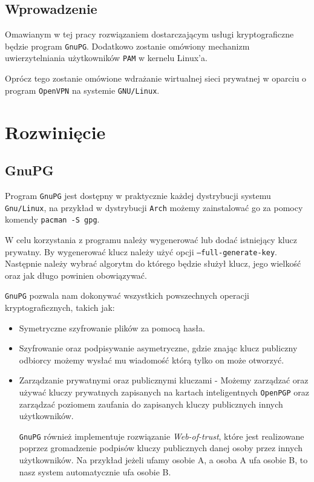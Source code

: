 \documentclass[12pt,a4paper]{article}
\begin{document}
\newpage

\subsection{Wprowadzenie}

Omawianym w tej pracy rozwiązaniem dostarczającym usługi kryptograficzne będzie
program \texttt{GnuPG}. Dodatkowo zostanie omówiony mechanizm uwierzytelniania
użytkowników \texttt{PAM} w kernelu Linux'a.

Oprócz tego zostanie omówione wdrażanie wirtualnej sieci prywatnej w oparciu o
program \texttt{OpenVPN} na systemie \texttt{GNU/Linux}.



\section{Rozwinięcie}

\subsection{GnuPG}

Program \texttt{GnuPG} jest dostępny w praktycznie każdej dystrybucji systemu
\texttt{Gnu/Linux}, na przykład w dystrybucji \texttt{Arch} możemy zainstalować
go za pomocy komendy \texttt{pacman -S gpg}.

W celu korzystania z programu należy wygenerować lub dodać istniejący klucz
prywatny. By wygenerować klucz należy użyć opcji \texttt{--full-generate-key}.
Następnie należy wybrać algorytm do którego będzie służył klucz, jego wielkość
oraz jak długo powinien obowiązywać.

\texttt{GnuPG} pozwala nam dokonywać wszystkich powszechnych operacji
kryptograficznych, takich jak:
\begin{itemize}
  \item Symetryczne szyfrowanie plików za pomocą hasła.
  \item Szyfrowanie oraz podpisywanie asymetryczne, gdzie znając klucz publiczny
    odbiorcy możemy wysłać mu wiadomość którą tylko on może otworzyć.
  \item Zarządzanie prywatnymi oraz publicznymi kluczami - Możemy zarządzać oraz
    używać kluczy prywatnych zapisanych na kartach inteligentnych
    \texttt{OpenPGP} oraz zarządzać poziomem zaufania do zapisanych kluczy
    publicznych innych użytkowników. 

    \texttt{GnuPG} również implementuje rozwiązanie \emph{Web-of-trust}, które
    jest realizowane poprzez gromadzenie podpisów kluczy publicznych danej osoby
    przez innych użytkowników. Na przykład jeżeli ufamy osobie A, a osoba A ufa
    osobie B, to nasz system automatycznie ufa osobie B.
\end{itemize}
\end{document}

